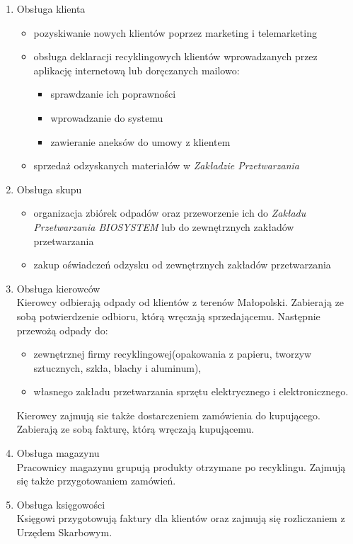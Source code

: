 

\begin{enumerate}
	\item Obsługa klienta \\
		\begin{itemize}
			\item pozyskiwanie nowych klientów poprzez marketing i telemarketing
			\item obsługa deklaracji recyklingowych klientów wprowadzanych przez aplikację internetową lub doręczanych mailowo: 
				\begin{itemize}
					\item sprawdzanie ich poprawności
					\item wprowadzanie do systemu
					\item zawieranie aneksów do umowy z klientem
				\end{itemize}
			\item sprzedaż odzyskanych materiałów w \emph{Zakładzie Przetwarzania}
		\end{itemize}

	\item Obsługa skupu \\
		\begin{itemize}
			\item organizacja zbiórek odpadów oraz przeworzenie ich do \emph{Zakładu Przetwarzania BIOSYSTEM} lub do zewnętrznych zakładów przetwarzania
			\item zakup oświadczeń odzysku od zewnętrznych zakładów przetwarzania
		\end{itemize}

	\item Obsługa kierowców \\
	Kierowcy odbierają odpady od klientów z terenów Małopolski. Zabierają ze sobą potwierdzenie odbioru, którą wręczają sprzedającemu. Następnie przewożą odpady do:
		\begin{itemize}
			\item zewnętrznej firmy recyklingowej(opakowania z papieru, tworzyw sztucznych, szkła, blachy i aluminum),
			\item własnego zakładu przetwarzania sprzętu elektrycznego i elektronicznego.
		\end{itemize}
	Kierowcy zajmują sie także dostarczeniem zamówienia do kupującego. Zabierają ze sobą fakturę, którą wręczają kupującemu.

	\item Obsługa magazynu \\
	Pracownicy magazynu grupują produkty otrzymane po recyklingu. Zajmują się także przygotowaniem zamówień.

	\item Obsługa księgowości \\
	Księgowi przygotowują faktury dla klientów oraz zajmują się rozliczaniem z Urzędem Skarbowym.
\end{enumerate}
